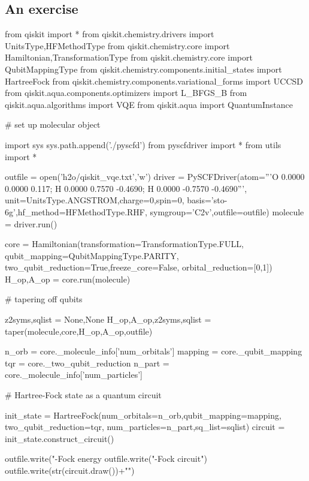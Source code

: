 \documentclass{article}
\begin{document}
\pagebreak
\newpage

\subsection{An exercise}

\begin{python}
from qiskit import *
from qiskit.chemistry.drivers import UnitsType,HFMethodType
from qiskit.chemistry.core import Hamiltonian,TransformationType
from qiskit.chemistry.core import QubitMappingType
from qiskit.chemistry.components.initial_states import HartreeFock
from qiskit.chemistry.components.variational_forms import UCCSD
from qiskit.aqua.components.optimizers import L_BFGS_B
from qiskit.aqua.algorithms import VQE
from qiskit.aqua import QuantumInstance

# set up molecular object

import sys
sys.path.append('./pyscfd')
from pyscfdriver import *
from utils       import *

outfile   = open('h2o/qiskit_vqe.txt','w')
driver    = PySCFDriver(atom='''O 0.0000  0.0000  0.117; 
                                H 0.0000  0.7570 -0.4690; 
                                H 0.0000 -0.7570 -0.4690''',
                        unit=UnitsType.ANGSTROM,charge=0,spin=0,
                        basis='sto-6g',hf_method=HFMethodType.RHF,
                        symgroup='C2v',outfile=outfile)
molecule  = driver.run()

core      = Hamiltonian(transformation=TransformationType.FULL,
                        qubit_mapping=QubitMappingType.PARITY,
                        two_qubit_reduction=True,freeze_core=False,
                        orbital_reduction=[0,1])
H_op,A_op = core.run(molecule)

# tapering off qubits

z2syms,sqlist           = None,None
H_op,A_op,z2syms,sqlist = taper(molecule,core,H_op,A_op,outfile)

n_orb   = core._molecule_info['num_orbitals']
mapping = core._qubit_mapping
tqr     = core._two_qubit_reduction
n_part  = core._molecule_info['num_particles']

# Hartree-Fock state as a quantum circuit

init_state = HartreeFock(num_orbitals=n_orb,qubit_mapping=mapping,
                         two_qubit_reduction=tqr,
                         num_particles=n_part,sq_list=sqlist)
circuit    = init_state.construct_circuit()

outfile.write("\nHartree-Fock energy %
outfile.write("\nHartree-Fock circuit\n")
outfile.write(str(circuit.draw())+"\n")




\end{python}
\end{document}
